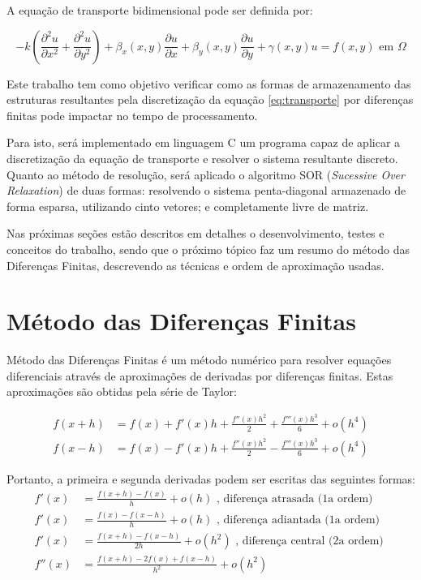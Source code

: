 \documentclass[
	11pt,				%
	oneside,			%
	a4paper,			%
	english,			%
	brazil,				%
	]{article}
\begin{document}
A equação de transporte bidimensional pode ser definida por:

\begin{equation} \label{eq:transporte}
- k \left(\frac{\partial^2 u}{\partial x^2} + \frac{\partial^2 u}{\partial 
y^2}\right) +
\beta_x(x,y)\frac{\partial u}{\partial x} +
\beta_y(x,y)\frac{\partial u}{\partial y} +
\gamma(x,y)u = f(x,y) \text{ em } \Omega
\end{equation}

Este trabalho tem como objetivo verificar como as formas de armazenamento das 
estruturas resultantes pela discretização da equação \eqref{eq:transporte} por 
diferenças finitas pode impactar no tempo de processamento.

Para isto, será implementado em linguagem C um programa capaz de aplicar a 
discretização da equação de transporte e resolver o sistema resultante 
discreto. Quanto ao método de resolução, será aplicado o algoritmo SOR
(\textit{Sucessive Over Relaxation}) de duas formas: resolvendo o sistema 
penta-diagonal armazenado de forma esparsa, utilizando  cinto vetores; e 
completamente livre de matriz.

Nas próximas seções estão descritos em detalhes o desenvolvimento, testes e 
conceitos do trabalho, sendo que o próximo tópico faz um resumo do método das 
Diferenças Finitas, descrevendo as técnicas e ordem de aproximação usadas.

\section{Método das Diferenças Finitas}
Método das Diferenças Finitas é um método numérico para resolver equações 
diferenciais através de aproximações de derivadas por diferenças finitas. Estas 
aproximações são obtidas pela série de Taylor:

\begin{align*}
f(x+h) &= f(x)+f'(x)h + \frac{f''(x)h^2}{2} + \frac{f'''(x)h^3}{6} + o(h^4) \\ 
f(x-h) &= f(x) - f'(x)h + \frac{f''(x)h^2}{2} - \frac{f'''(x)h^3}{6} + 
o(h^4)
\end{align*}

Portanto, a primeira e segunda derivadas podem ser escritas das
seguintes formas:
\begin{align*}
f'(x) &= \frac{f(x+h)-f(x)}{h}+o(h) \text{ , diferença atrasada
(1a ordem) }  \\
f'(x) &= \frac{f(x) - f(x-h)}{h} + o(h) \text{ , diferença adiantada
(1a ordem) } \\
f'(x) &= \frac{f(x+h) - f(x-h)}{2h} + o(h^2) \text{ , diferença central 
(2a ordem) } \\
f''(x) &= \frac{f(x+h) -2f(x) + f(x-h)}{h^2} + o(h^2)
\end{align*}
\end{document}
